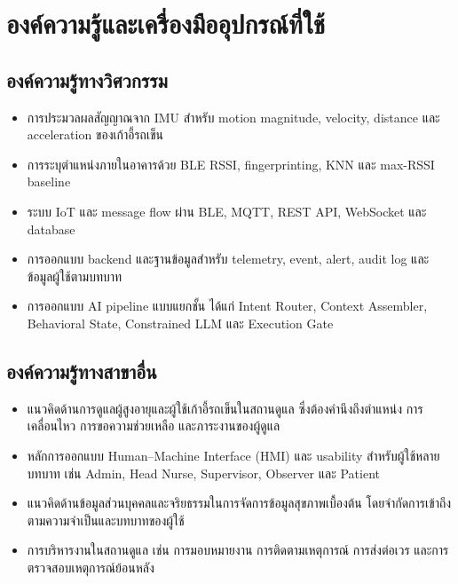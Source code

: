 \section{องค์ความรู้และเครื่องมืออุปกรณ์ที่ใช้}

\subsection*{องค์ความรู้ทางวิศวกรรม}
\begin{itemize}
    \item การประมวลผลสัญญาณจาก IMU สำหรับ motion magnitude, velocity, distance และ acceleration ของเก้าอี้รถเข็น 
    \item การระบุตำแหน่งภายในอาคารด้วย BLE RSSI, fingerprinting, KNN และ max-RSSI baseline 
    \item ระบบ IoT และ message flow ผ่าน BLE, MQTT, REST API, WebSocket และ database 
    \item การออกแบบ backend และฐานข้อมูลสำหรับ telemetry, event, alert, audit log และข้อมูลผู้ใช้ตามบทบาท 
    \item การออกแบบ AI pipeline แบบแยกชั้น ได้แก่ Intent Router, Context Assembler, Behavioral State, Constrained LLM และ Execution Gate 
\end{itemize}

\subsection*{องค์ความรู้ทางสาขาอื่น}
\begin{itemize}
    \item แนวคิดด้านการดูแลผู้สูงอายุและผู้ใช้เก้าอี้รถเข็นในสถานดูแล ซึ่งต้องคำนึงถึงตำแหน่ง การเคลื่อนไหว การขอความช่วยเหลือ และภาระงานของผู้ดูแล 
    \item หลักการออกแบบ Human--Machine Interface (HMI) และ usability สำหรับผู้ใช้หลายบทบาท เช่น Admin, Head Nurse, Supervisor, Observer และ Patient 
    \item แนวคิดด้านข้อมูลส่วนบุคคลและจริยธรรมในการจัดการข้อมูลสุขภาพเบื้องต้น โดยจำกัดการเข้าถึงตามความจำเป็นและบทบาทของผู้ใช้ 
    \item การบริหารงานในสถานดูแล เช่น การมอบหมายงาน การติดตามเหตุการณ์ การส่งต่อเวร และการตรวจสอบเหตุการณ์ย้อนหลัง 
\end{itemize}

